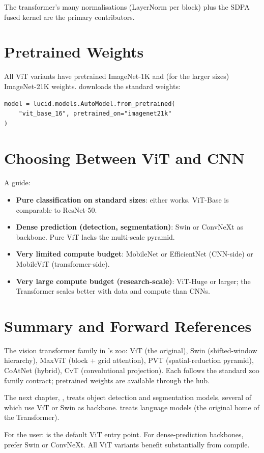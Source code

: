 The transformer's many normalisations (LayerNorm per block) plus
the SDPA fused kernel are the primary contributors.

\section{Pretrained Weights}
\label{sec:vision_transformers:pretrained}

All ViT variants have pretrained ImageNet-1K and (for the larger
sizes) ImageNet-21K weights.  downloads
the standard weights:

\begin{lstlisting}[style=lucid,language=LucidPython]
model = lucid.models.AutoModel.from_pretrained(
    "vit_base_16", pretrained_on="imagenet21k"
)
\end{lstlisting}

\section{Choosing Between ViT and CNN}
\label{sec:vision_transformers:vit_vs_cnn}

A guide:

\begin{itemize}
  \item \textbf{Pure classification on standard sizes}: either
    works. ViT-Base is comparable to ResNet-50.
  \item \textbf{Dense prediction (detection, segmentation)}:
    Swin or ConvNeXt as backbone. Pure ViT lacks the
    multi-scale pyramid.
  \item \textbf{Very limited compute budget}: MobileNet or
    EfficientNet (CNN-side) or MobileViT (transformer-side).
  \item \textbf{Very large compute budget (research-scale)}:
    ViT-Huge or larger; the Transformer scales better with
    data and compute than CNNs.
\end{itemize}

\section{Summary and Forward References}
\label{sec:vision_transformers:summary}

The vision transformer family in \Lucid's zoo: ViT (the
original), Swin (shifted-window hierarchy), MaxViT (block + grid
attention), PVT (spatial-reduction pyramid), CoAtNet (hybrid),
CvT (convolutional projection). Each follows the standard zoo
family contract; pretrained weights are available through the
hub.

The next chapter, , treats
object detection and segmentation models, several of which use
ViT or Swin as backbone.  treats
language models (the original home of the Transformer).

\begin{lucidnote}
For the user:  is the default ViT entry
point. For dense-prediction backbones, prefer Swin or ConvNeXt.
All ViT variants benefit substantially from compile.
\end{lucidnote}
